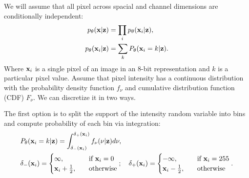 We will assume that all pixel across spacial and channel dimensions are conditionally independent:
\begin{align}
    p_{\theta}({\mathbf{x}}|{\mathbf{z}}) &= \prod_i p_{\theta}({\mathbf{x}}_i|{\mathbf{z}}),\\
    p_{\theta}({\mathbf{x}}_i|{\mathbf{z}}) &= \sum_{k} P_{\theta}({\mathbf{x}}_i = k|{\mathbf{z}}).
\end{align}
Where ${\mathbf{x}}_i$ is a single pixel of an image in an 8-bit representation and $k$ is a particular pixel value. 
Assume that pixel intensity has a continuous distribution with the probability density function $f_{\nu}$ and cumulative distribution function (CDF) $F_{\nu}$. We can discretize it in two ways. 

The first option is to split the support of the intensity random variable into bins and compute probability of each bin via integration:
\begin{equation}\label{eq:intro_int_discr}
\begin{aligned}
    &P_{\theta}(\rvx_i = k|\rvz) = \int_{\delta_{-}(\rvx_i)}^{\delta_{+}(\rvx_i)} f_{\nu}(\nu|\rvz)d\nu,\\
    &\delta_{-}(\rvx_i) =
    \begin{cases}
        \infty,\quad &\text{if } \rvx_i = 0\\
        \rvx_i + \frac12,\quad&\text{otherwise}
    \end{cases};  \quad
    \delta_{+}(\rvx_i) =
    \begin{cases}
        -\infty,\quad &\text{if } \rvx_i = 255\\
        \rvx_i - \frac12,\quad&\text{otherwise}
    \end{cases}.
\end{aligned}
\end{equation}

